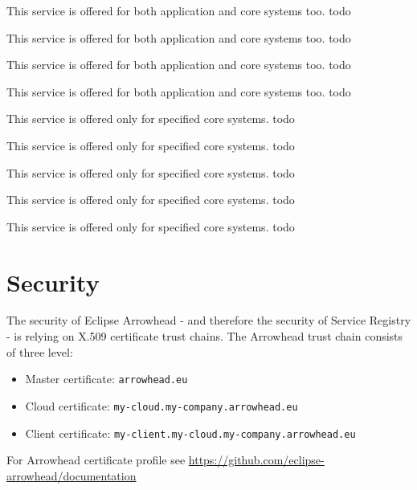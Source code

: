 \documentclass[a4paper]{arrowhead}
\begin{document}
This service is offered for both application and core systems too.
\color{red}todo\color{black}

This service is offered for both application and core systems too.
\color{red}todo\color{black}

This service is offered for both application and core systems too.
\color{red}todo\color{black}

This service is offered for both application and core systems too.
\color{red}todo\color{black}

This service is offered only for specified core systems.
\color{red}todo\color{black}

This service is offered only for specified core systems.
\color{red}todo\color{black}

This service is offered only for specified core systems.
\color{red}todo\color{black}

This service is offered only for specified core systems.
\color{red}todo\color{black}

This service is offered only for specified core systems.
\color{red}todo\color{black}

\newpage

\section{Security}
\label{sec:security}

The security of Eclipse Arrowhead - and therefore the security of Service Registry  - is relying on X.509 certificate trust chains. The Arrowhead trust chain consists of three level:
\begin{itemize}
    \item Master certificate: \texttt{arrowhead.eu}
    \item Cloud certificate: \texttt {my-cloud.my-company.arrowhead.eu}
    \item Client certificate: \texttt{my-client.my-cloud.my-company.arrowhead.eu}
\end{itemize}

For Arrowhead certificate profile see \url{https://github.com/eclipse-arrowhead/documentation}
\end{document}
